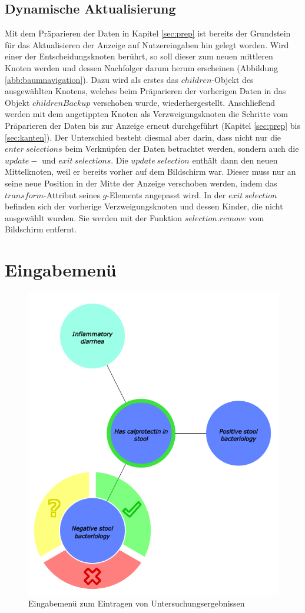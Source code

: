\subsection{Dynamische Aktualisierung}\label{sec:dynamische_aktual}
Mit dem Präparieren der Daten in Kapitel \ref{sec:prep} ist bereits der Grundstein für das Aktualisieren der Anzeige auf Nutzereingaben hin gelegt worden. Wird einer der Entscheidungsknoten berührt, so soll dieser zum neuen mittleren Knoten werden und dessen Nachfolger darum herum erscheinen (Abbildung \ref{abb:baumnavigation}). Dazu wird als erstes das $children$-Objekt des ausgewählten Knotens, welches beim Präparieren der vorherigen Daten in das Objekt $childrenBackup$ verschoben wurde, wiederhergestellt. Anschließend werden mit dem angetippten Knoten als Verzweigungsknoten die Schritte vom Präparieren der Daten bis zur Anzeige erneut durchgeführt (Kapitel \ref{sec:prep} bis \ref{sec:kanten}). Der Unterschied besteht diesmal aber darin, dass nicht nur die $enter\ selections$ beim Verknüpfen der Daten betrachtet werden, sondern auch die $update-$ und $exit\ selections$. Die $update\ selection$ enthält dann den neuen Mittelknoten, weil er bereits vorher auf dem Bildschirm war. Dieser muss nur an seine neue Position in der Mitte der Anzeige verschoben werden, indem das $transform$-Attribut seines $g$-Elements angepasst wird. In der $exit\ selection$ befinden sich der vorherige Verzweigungsknoten und dessen Kinder, die nicht ausgewählt wurden. Sie werden mit der Funktion $selection.remove$ vom Bildschirm entfernt. 


\section{Eingabemenü}\label{sec:eingabemenu}
\begin{figure}
	\centering
	\includegraphics[width=.6\linewidth]{../screenshots/eingabemenu.PNG}
	\caption{Eingabemenü zum Eintragen von Untersuchungsergebnissen}
	\label{abb:eingabemenu}
\end{figure} 
